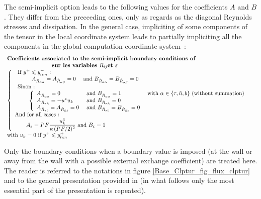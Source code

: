 The semi-implicit option leads to the following values for the
coefficients $A$ and $B$. They differ from the preceeding ones, only
as regards as the diagonal Reynolds stresses and dissipation.
In the general case, impliciting of some components of the tensor
in the local coordinate system leads to partially impliciting
all the components in the global computation coordinate system~:
\begin{equation}
\begin{array}{l}
\text{\bf Coefficients associated to the semi-implicit boundary conditions of}\\
\qquad\qquad\qquad\qquad\text {\bf sur les variables } R_{ij} \text{\bf et } \varepsilon \\
\left\{\begin{array}{l}
\begin{array}{l}
\text{If }y^+\leqslant y^+_{lim}\text{~:}\\
\qquad\begin{array}{lll}
      A_{\hat R_{\alpha\alpha}} = A_{\hat R_{\alpha\beta}} = 0  &\text{ and } B_{\hat R_{\alpha\alpha}} =B_{\hat R_{\alpha\beta}}= 0 &
      \end{array}\\
\text{Sinon~:}\\
\qquad\left\{\begin{array}{lll}
      A_{\hat R_{\alpha\alpha}} = 0  &\text{ and } B_{\hat R_{\alpha\alpha}} = 1 &\text{ with }\alpha \in \{\tau,\tilde{n},b\}\text{ (without summation)}\\
      A_{\hat R_{\tau \tilde{n}}} = -u^*u_k   &\text{ and } B_{\hat R_{\tau \tilde{n}}} = 0 &\\
      A_{\hat R_{\tau  b}} = A_{\hat R_{\tilde{n} b}} = 0   &\text{ and } B_{\hat R_{\tau b}} =B_{\hat R_{\tilde{n} b}} = 0 &\\
      \end{array}\right.
\end{array}\\
\text{And for all cases~:}\\
\qquad A_\varepsilon=I'F\displaystyle\frac{ u_k^3}{\kappa\, (I'F/2)^2}\text{ and } B_\varepsilon= 1
\end{array}\right.\\
\text{with } u_k = 0 \text { if } y^+\leqslant y^+_{lim}
\end{array}
\end{equation}




\newpage
{}
Only the boundary conditions when a boundary value is imposed
(at the wall or away from the wall with a possible external exchange coefficient)
are treated here.
The reader is referred to the notations in figure
\ref{Base_Clptur_fig_flux_clptur} and to the general presentation provided in
 (in what follows only the most essential part of the
presentation is repeated).

